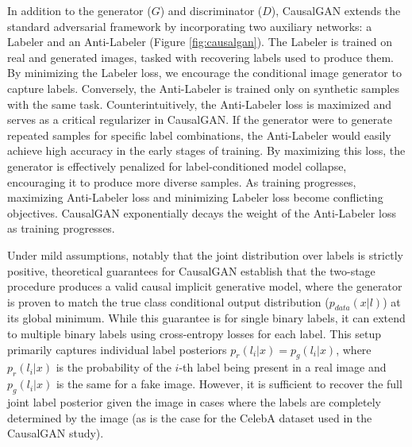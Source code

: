 In addition to the generator ($G$) and discriminator ($D$), CausalGAN extends the standard adversarial framework by incorporating two auxiliary networks: a Labeler and an Anti-Labeler (Figure \ref{fig:causalgan}). The Labeler is trained on real and generated images, tasked with recovering labels used to produce them. By minimizing the Labeler loss, we encourage the conditional image generator to capture labels. Conversely, the Anti-Labeler is trained only on synthetic samples with the same task. Counterintuitively, the Anti-Labeler loss is maximized and serves as a critical regularizer in CausalGAN. If the generator were to generate repeated samples for specific label combinations, the Anti-Labeler would easily achieve high accuracy in the early stages of training. By maximizing this loss, the generator is effectively penalized for label-conditioned model collapse, encouraging it to produce more diverse samples. As training progresses, maximizing Anti-Labeler loss and minimizing Labeler loss become conflicting objectives. CausalGAN exponentially decays the weight of the Anti-Labeler loss as training progresses.


Under mild assumptions, notably that the joint distribution over labels is strictly positive, theoretical guarantees for CausalGAN establish that the two-stage procedure produces a valid causal implicit generative model, where the generator is proven to match the true class conditional output distribution ($p_{data}(x|l)$) at its global minimum. While this guarantee is for single binary labels, it can extend to multiple binary labels using cross-entropy losses for each label. This setup primarily captures individual label posteriors $p_r(l_i|x) = p_g(l_i|x)$, where $p_r(l_i|x)$ is the probability of the $i$-th label being present in a real image and $p_g(l_i|x)$ is the same for a fake image. However, it is sufficient to recover the full joint label posterior given the image in cases where the labels are completely determined by the image (as is the case for the CelebA dataset \cite{liu2015deep} used in the CausalGAN study).


